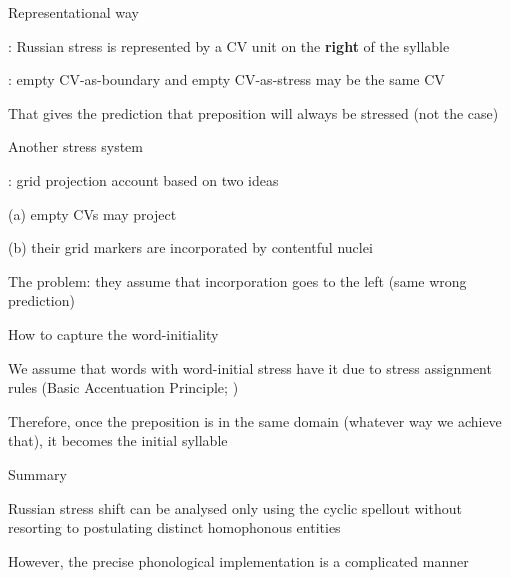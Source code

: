 \documentclass{beamer}
\begin{document}
	\begin{frame}{Representational way}

		\textcite{Enguehard:2016}: Russian stress is represented by a CV unit on the \textbf{right} of the syllable

		\textcite{Enguehard:2014}: empty CV-as-boundary and empty CV-as-stress may be the same CV
		
 		That gives the prediction that preposition will always be stressed (not the case)

	\end{frame}

	\begin{frame}{Another stress system}

		\textcite{Faust:2018}: grid projection account based on two ideas

		(a) empty CVs may project

		(b) their grid markers are incorporated by contentful nuclei

		The problem: they assume that incorporation goes to the left (same wrong prediction)

	\end{frame}

	\begin{frame}{How to capture the word-initiality}

		We assume that words with word-initial stress have it due to stress assignment rules (Basic Accentuation Principle; \cite{Melvold:1989})

	Therefore, once the preposition is in the same domain (whatever way we achieve that), it becomes the initial syllable

	\end{frame}

	\begin{frame}{Summary}

		Russian stress shift can be analysed only using the cyclic spellout without resorting to postulating distinct homophonous entities

		However, the precise phonological implementation is a complicated manner

	\end{frame}
\end{document}
